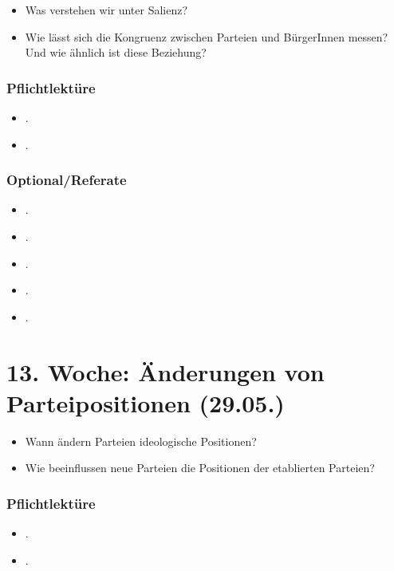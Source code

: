 \documentclass[abstract=on,parskip=full,headings=standardclasses,fontsize=11pt,paper=a4]{scrartcl}
\begin{document}
\begin{itemize}
\renewcommand\labelitemi{--}
\item Was verstehen wir unter Salienz?
\item Wie lässt sich die Kongruenz zwischen Parteien und BürgerInnen messen? Und wie ähnlich ist diese Beziehung?
\end{itemize}

\subsubsection*{Pflichtlektüre}
\begin{itemize}
\item {}.
\item {}.
\end{itemize}

\subsubsection*{Optional/Referate}
\begin{itemize}
\item {}.
\item {}.
\item {}.
\item {}.
\item {}.
\end{itemize}


\section{13. Woche: Änderungen von Parteipositionen (29.05.)}

\begin{itemize}
\renewcommand\labelitemi{--}
\item Wann ändern Parteien ideologische Positionen?
\item Wie beeinflussen neue Parteien die Positionen der etablierten Parteien?
\end{itemize}


\subsubsection*{Pflichtlektüre}
\begin{itemize}
\item {}.
\item {}.
\end{itemize}
\end{document}
